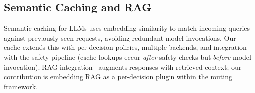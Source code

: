 \subsection{Semantic Caching and RAG}

Semantic caching for LLMs uses embedding similarity to match incoming queries against previously seen requests, avoiding redundant model invocations.
Our cache extends this with per-decision policies, multiple backends, and integration with the safety pipeline (cache lookups occur \emph{after} safety checks but \emph{before} model invocation).
RAG integration~\cite{lewis2020rag,wang2021milvus} augments responses with retrieved context; our contribution is embedding RAG as a per-decision plugin within the routing framework.
